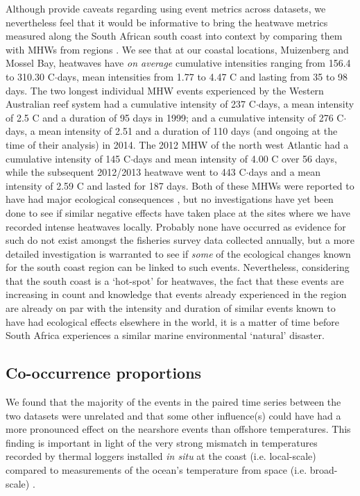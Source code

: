 \documentclass[a4paper,10pt,review]{elsarticle}
\begin{document}
Although \citet{Hobday2016} provide caveats regarding using event metrics across datasets, we nevertheless feel that it would be informative to bring the heatwave metrics measured along the South African south coast into context by comparing them with MHWs from regions \citep[see][]{Hobday2016}. We see that at our coastal locations, Muizenberg and Mossel Bay, heatwaves have \emph{on average} cumulative intensities ranging from 156.4 to 310.30 \degree C$\cdot$days, mean intensities from 1.77 to 4.47 \degree C and lasting from 35 to 98 days. The two longest individual MHW events experienced by the Western Australian reef system \citep{Feng2013} had a cumulative intensity of 237 \degree C$\cdot$days, a mean intensity of 2.5 \degree C and a duration of 95 days in 1999; and a cumulative intensity of 276 \degree C$\cdot$days, a mean intensity of 2.51 and a duration of 110 days (and ongoing at the time of their analysis) in 2014. The 2012 MHW of the north west Atlantic \citep{Mills2012, Chen2014} had a cumulative intensity of 145 \degree C$\cdot$days and mean intensity of 4.00 \degree C over 56 days, while the subsequent 2012/2013 heatwave went to 443 \degree C$\cdot$days and a mean intensity of 2.59 \degree C and lasted for 187 days. Both of these MHWs were reported to have had major ecological consequences \citep{Feng2013, Mills2012, Chen2014}, but no investigations have yet been done to see if similar negative effects have taken place at the sites where we have recorded intense heatwaves locally. Probably none have occurred as evidence for such do not exist amongst the fisheries survey data collected annually, but a more detailed investigation is warranted to see if \emph{some} of the ecological changes known for the south coast region \citep{Bolton2012} can be linked to such events. Nevertheless, considering that the south coast is a `hot-spot' for heatwaves, the fact that these events are increasing in count and knowledge that events already experienced in the region are already on par with the intensity and duration of similar events known to have had ecological effects elsewhere in the world, it is a matter of time before South Africa experiences a similar marine environmental `natural' disaster.

\subsection{Co-occurrence proportions}
We found that the majority of the events in the paired time series between the two datasets were unrelated and that some other influence(s) could have had a more pronounced effect on the nearshore events than offshore temperatures. This finding is important in light of the very strong mismatch in temperatures recorded by thermal loggers installed \emph{in situ} at the coast (i.e. local-scale) compared to measurements of the ocean's temperature from space (i.e. broad-scale) \citep{Smit2013}.
\end{document}
